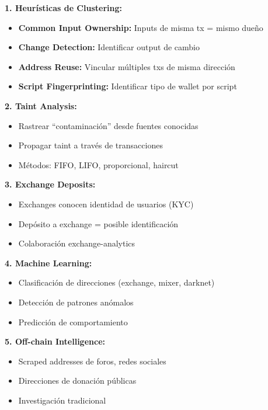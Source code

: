 \documentclass[11pt,a4paper,twoside]{book}
\theoremstyle{definition}
\theoremstyle{remark}
\begin{document}
\begin{mathnote}
\textbf{1. Heurísticas de Clustering:}
\begin{itemize}
    \item \textbf{Common Input Ownership:} Inputs de misma tx = mismo dueño
    \item \textbf{Change Detection:} Identificar output de cambio
    \item \textbf{Address Reuse:} Vincular múltiples txs de misma dirección
    \item \textbf{Script Fingerprinting:} Identificar tipo de wallet por script
\end{itemize}

\textbf{2. Taint Analysis:}
\begin{itemize}
    \item Rastrear ``contaminación'' desde fuentes conocidas
    \item Propagar taint a través de transacciones
    \item Métodos: FIFO, LIFO, proporcional, haircut
\end{itemize}

\textbf{3. Exchange Deposits:}
\begin{itemize}
    \item Exchanges conocen identidad de usuarios (KYC)
    \item Depósito a exchange = posible identificación
    \item Colaboración exchange-analytics
\end{itemize}

\textbf{4. Machine Learning:}
\begin{itemize}
    \item Clasificación de direcciones (exchange, mixer, darknet)
    \item Detección de patrones anómalos
    \item Predicción de comportamiento
\end{itemize}

\textbf{5. Off-chain Intelligence:}
\begin{itemize}
    \item Scraped addresses de foros, redes sociales
    \item Direcciones de donación públicas
    \item Investigación tradicional
\end{itemize}
\end{mathnote}
\end{document}
